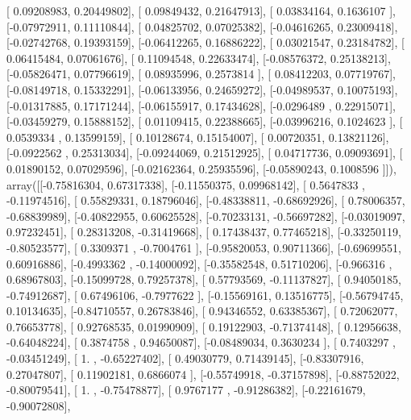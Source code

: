 \documentclass{article}
\begin{document}
       [ 0.09208983,  0.20449802],
       [ 0.09849432,  0.21647913],
       [ 0.03834164,  0.1636107 ],
       [-0.07972911,  0.11110844],
       [ 0.04825702,  0.07025382],
       [-0.04616265,  0.23009418],
       [-0.02742768,  0.19393159],
       [-0.06412265,  0.16886222],
       [ 0.03021547,  0.23184782],
       [ 0.06415484,  0.07061676],
       [ 0.11094548,  0.22633474],
       [-0.08576372,  0.25138213],
       [-0.05826471,  0.07796619],
       [ 0.08935996,  0.2573814 ],
       [ 0.08412203,  0.07719767],
       [-0.08149718,  0.15332291],
       [-0.06133956,  0.24659272],
       [-0.04989537,  0.10075193],
       [-0.01317885,  0.17171244],
       [-0.06155917,  0.17434628],
       [-0.0296489 ,  0.22915071],
       [-0.03459279,  0.15888152],
       [ 0.01109415,  0.22388665],
       [-0.03996216,  0.1024623 ],
       [ 0.0539334 ,  0.13599159],
       [ 0.10128674,  0.15154007],
       [ 0.00720351,  0.13821126],
       [-0.0922562 ,  0.25313034],
       [-0.09244069,  0.21512925],
       [ 0.04717736,  0.09093691],
       [ 0.01890152,  0.07029596],
       [-0.02162364,  0.25935596],
       [-0.05890243,  0.1008596 ]]), array([[-0.75816304,  0.67317338],
       [-0.11550375,  0.09968142],
       [ 0.5647833 , -0.11974516],
       [ 0.55829331,  0.18796046],
       [-0.48338811, -0.68692926],
       [ 0.78006357, -0.68839989],
       [-0.40822955,  0.60625528],
       [-0.70233131, -0.56697282],
       [-0.03019097,  0.97232451],
       [ 0.28313208, -0.31419668],
       [ 0.17438437,  0.77465218],
       [-0.33250119, -0.80523577],
       [ 0.3309371 , -0.7004761 ],
       [-0.95820053,  0.90711366],
       [-0.69699551,  0.60916886],
       [-0.4993362 , -0.14000092],
       [-0.35582548,  0.51710206],
       [-0.966316  ,  0.68967803],
       [-0.15099728,  0.79257378],
       [ 0.57793569, -0.11137827],
       [ 0.94050185, -0.74912687],
       [ 0.67496106, -0.7977622 ],
       [-0.15569161,  0.13516775],
       [-0.56794745,  0.10134635],
       [-0.84710557,  0.26783846],
       [ 0.94346552,  0.63385367],
       [ 0.72062077,  0.76653778],
       [ 0.92768535,  0.01990909],
       [ 0.19122903, -0.71374148],
       [ 0.12956638, -0.64048224],
       [ 0.3874758 ,  0.94650087],
       [-0.08489034,  0.3630234 ],
       [ 0.7403297 , -0.03451249],
       [ 1.        , -0.65227402],
       [ 0.49030779,  0.71439145],
       [-0.83307916,  0.27047807],
       [ 0.11902181,  0.6866074 ],
       [-0.55749918, -0.37157898],
       [-0.88752022, -0.80079541],
       [ 1.        , -0.75478877],
       [ 0.9767177 , -0.91286382],
       [-0.22161679, -0.90072808],
\end{document}
